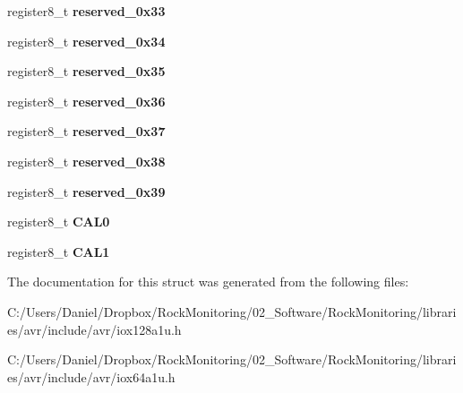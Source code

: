 \begin{DoxyCompactItemize}
\item 
register8\+\_\+t {\bfseries reserved\+\_\+0x33}\hypertarget{struct_u_s_b__struct_a99011893dfdc2e67231619034eafe308}{}\label{struct_u_s_b__struct_a99011893dfdc2e67231619034eafe308}

\item 
register8\+\_\+t {\bfseries reserved\+\_\+0x34}\hypertarget{struct_u_s_b__struct_a10457a6fec23c1a11a10c5adb494bd5d}{}\label{struct_u_s_b__struct_a10457a6fec23c1a11a10c5adb494bd5d}

\item 
register8\+\_\+t {\bfseries reserved\+\_\+0x35}\hypertarget{struct_u_s_b__struct_ad76ff65b15dd099134165f55b624f3e0}{}\label{struct_u_s_b__struct_ad76ff65b15dd099134165f55b624f3e0}

\item 
register8\+\_\+t {\bfseries reserved\+\_\+0x36}\hypertarget{struct_u_s_b__struct_a7a423ad2a0ccd2e0dd0d97e0afda3d4d}{}\label{struct_u_s_b__struct_a7a423ad2a0ccd2e0dd0d97e0afda3d4d}

\item 
register8\+\_\+t {\bfseries reserved\+\_\+0x37}\hypertarget{struct_u_s_b__struct_af982fe4cda5e952fbdd11923adae417d}{}\label{struct_u_s_b__struct_af982fe4cda5e952fbdd11923adae417d}

\item 
register8\+\_\+t {\bfseries reserved\+\_\+0x38}\hypertarget{struct_u_s_b__struct_a0957271ab7b4012aa3774e901aa42f93}{}\label{struct_u_s_b__struct_a0957271ab7b4012aa3774e901aa42f93}

\item 
register8\+\_\+t {\bfseries reserved\+\_\+0x39}\hypertarget{struct_u_s_b__struct_a8e2f00cffe002c0dd44bcfecc49ab9c7}{}\label{struct_u_s_b__struct_a8e2f00cffe002c0dd44bcfecc49ab9c7}

\item 
register8\+\_\+t {\bfseries C\+A\+L0}\hypertarget{struct_u_s_b__struct_a81af16de6032a0b2966fce17223d1aa8}{}\label{struct_u_s_b__struct_a81af16de6032a0b2966fce17223d1aa8}

\item 
register8\+\_\+t {\bfseries C\+A\+L1}\hypertarget{struct_u_s_b__struct_aeec5402ad796a628bff2f8b4267a5bd9}{}\label{struct_u_s_b__struct_aeec5402ad796a628bff2f8b4267a5bd9}

\end{DoxyCompactItemize}


The documentation for this struct was generated from the following files\+:\begin{DoxyCompactItemize}
\item 
C\+:/\+Users/\+Daniel/\+Dropbox/\+Rock\+Monitoring/02\+\_\+\+Software/\+Rock\+Monitoring/libraries/avr/include/avr/iox128a1u.\+h\item 
C\+:/\+Users/\+Daniel/\+Dropbox/\+Rock\+Monitoring/02\+\_\+\+Software/\+Rock\+Monitoring/libraries/avr/include/avr/iox64a1u.\+h\end{DoxyCompactItemize}
